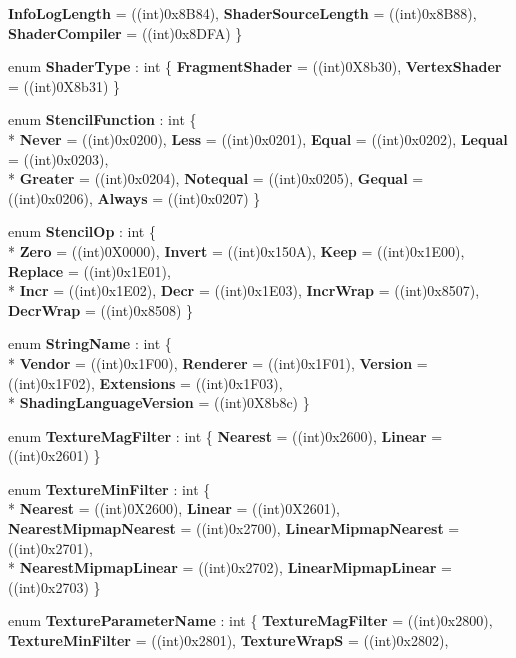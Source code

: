 \begin{DoxyCompactItemize}
{\bfseries Info\-Log\-Length} = ((int)0x8\-B84), 
{\bfseries Shader\-Source\-Length} = ((int)0x8\-B88), 
{\bfseries Shader\-Compiler} = ((int)0x8\-D\-F\-A)
 \}
\item 
enum {\bfseries Shader\-Type} \-: int \{ {\bfseries Fragment\-Shader} = ((int)0\-X8b30), 
{\bfseries Vertex\-Shader} = ((int)0\-X8b31)
 \}
\item 
enum {\bfseries Stencil\-Function} \-: int \{ \\*
{\bfseries Never} = ((int)0x0200), 
{\bfseries Less} = ((int)0x0201), 
{\bfseries Equal} = ((int)0x0202), 
{\bfseries Lequal} = ((int)0x0203), 
\\*
{\bfseries Greater} = ((int)0x0204), 
{\bfseries Notequal} = ((int)0x0205), 
{\bfseries Gequal} = ((int)0x0206), 
{\bfseries Always} = ((int)0x0207)
 \}
\item 
enum {\bfseries Stencil\-Op} \-: int \{ \\*
{\bfseries Zero} = ((int)0\-X0000), 
{\bfseries Invert} = ((int)0x150\-A), 
{\bfseries Keep} = ((int)0x1\-E00), 
{\bfseries Replace} = ((int)0x1\-E01), 
\\*
{\bfseries Incr} = ((int)0x1\-E02), 
{\bfseries Decr} = ((int)0x1\-E03), 
{\bfseries Incr\-Wrap} = ((int)0x8507), 
{\bfseries Decr\-Wrap} = ((int)0x8508)
 \}
\item 
enum {\bfseries String\-Name} \-: int \{ \\*
{\bfseries Vendor} = ((int)0x1\-F00), 
{\bfseries Renderer} = ((int)0x1\-F01), 
{\bfseries Version} = ((int)0x1\-F02), 
{\bfseries Extensions} = ((int)0x1\-F03), 
\\*
{\bfseries Shading\-Language\-Version} = ((int)0\-X8b8c)
 \}
\item 
enum {\bfseries Texture\-Mag\-Filter} \-: int \{ {\bfseries Nearest} = ((int)0x2600), 
{\bfseries Linear} = ((int)0x2601)
 \}
\item 
enum {\bfseries Texture\-Min\-Filter} \-: int \{ \\*
{\bfseries Nearest} = ((int)0\-X2600), 
{\bfseries Linear} = ((int)0\-X2601), 
{\bfseries Nearest\-Mipmap\-Nearest} = ((int)0x2700), 
{\bfseries Linear\-Mipmap\-Nearest} = ((int)0x2701), 
\\*
{\bfseries Nearest\-Mipmap\-Linear} = ((int)0x2702), 
{\bfseries Linear\-Mipmap\-Linear} = ((int)0x2703)
 \}
\item 
enum {\bfseries Texture\-Parameter\-Name} \-: int \{ {\bfseries Texture\-Mag\-Filter} = ((int)0x2800), 
{\bfseries Texture\-Min\-Filter} = ((int)0x2801), 
{\bfseries Texture\-Wrap\-S} = ((int)0x2802), 

\end{DoxyCompactItemize}

